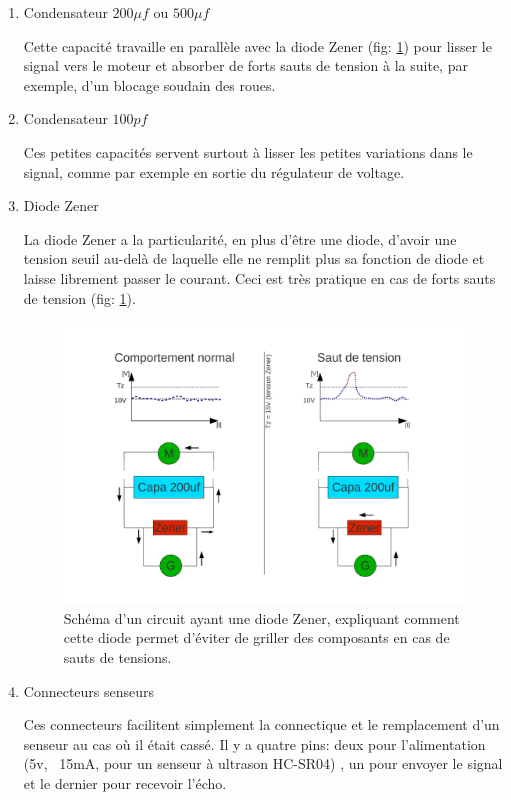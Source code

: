 \documentclass[a4paper,11pt]{report}
\begin{document}
{\begin{enumerate}
\item Condensateur $200\mu f$ ou $500\mu f$

Cette capacité travaille en parallèle avec la diode Zener (fig: \ref{zener}) pour lisser le signal vers le  moteur et absorber de forts sauts de tension à la suite, par
exemple, d'un blocage soudain des roues.

\item Condensateur $100pf$

Ces petites capacités servent surtout à lisser les petites variations dans le signal, comme par exemple en sortie du régulateur de voltage.

\item Diode Zener

La diode Zener a la particularité, en plus d'être une diode, d'avoir une tension seuil au-delà de laquelle elle ne remplit plus sa fonction de diode et laisse librement passer le courant. Ceci est très pratique en cas de forts sauts de tension (fig: \ref{zener}). 

\begin{figure}[h]
\centering
\includegraphics[width=1.0\textwidth]{CircuitZener.pdf} 
    \caption[Utilisation de la diode Zener]{\label{zener} Schéma d'un circuit ayant une diode Zener, expliquant comment cette diode permet d'éviter de griller des composants en cas de sauts de tensions. 
    }
\end{figure}


\item Connecteurs senseurs

Ces connecteurs facilitent simplement la connectique et le remplacement d'un senseur au cas où il était cassé. Il y a quatre pins: deux pour l'alimentation (5v, ~15mA, pour un senseur à ultrason HC-SR04) \cite{HC-SR04}, un pour envoyer le signal et le dernier pour recevoir l'écho.


\end{enumerate}}
\end{document}
